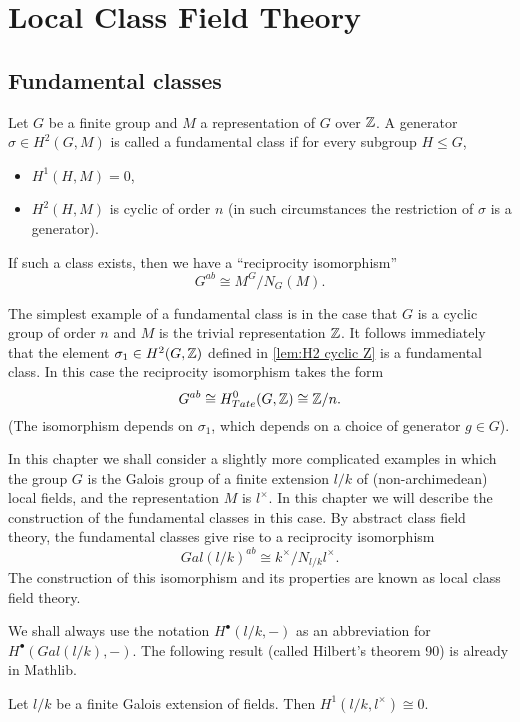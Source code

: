 \chapter{Local Class Field Theory}

\section{Fundamental classes}
Let $G$ be a finite group and $M$ a representation of $G$ over ${\mathbb Z}$.
A generator $\sigma \in H^2(G,M)$ is called a fundamental class if for every subgroup $H \le G$,
\begin{itemize}
	\item
	$H^1(H,M) = 0$,
	\item
	$H^2(H,M)$ is cyclic of order $n$
	(in such circumstances the restriction of $\sigma$ is a generator).
\end{itemize}
If such a class exists, then we have a ``reciprocity isomorphism''
\[
	G^{ab} \cong M^G / N_G(M).
\]

The simplest example of a fundamental class is in the case
that $G$ is a cyclic group of order $n$ and $M$ is the trivial representation ${\mathbb Z}$.
It follows immediately that the element $\sigma_1 \in H^2(G,{\mathbb Z})$ defined in
\ref{lem:H2 cyclic Z} is a fundamental class.
In this case the reciprocity isomorphism takes the form
\[
	G^{ab} \cong H^0_{Tate} (G,{\mathbb Z}) \cong {\mathbb Z}/n.
\]
(The isomorphism depends on $\sigma_1$, which depends on a choice of generator $g \in G$).

In this chapter we shall consider a slightly more complicated examples in which the group $G$ is
the Galois group of a finite extension $l/k$ of (non-archimedean) local fields, and the
representation $M$ is $l^\times$.
In this chapter we will describe the construction of the fundamental classes in this case.
By abstract class field theory, the fundamental classes give rise to a reciprocity isomorphism
\[
	Gal(l/k)^{ab} \cong k^\times / N_{l/k} l^\times.
\]
The construction of this isomorphism and its properties are known as local class field theory.

We shall always use the notation $H^\bullet(l/k,-)$ as an abbreviation
for $H^\bullet(Gal(l/k),-)$.
The following result (called Hilbert's theorem 90) is already in Mathlib.

\begin{theorem}\label{thm:hilbert 90}
	\mathlibok
	Let $l/k$ be a finite Galois extension of fields.
	Then $H^1(l/k, l^\times) \cong 0$.
\end{theorem}

